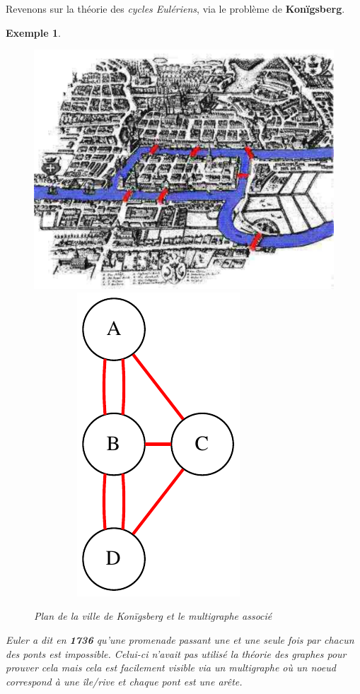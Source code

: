 \documentclass[12pt]{article}
\newtheorem{exemple}{Exemple}[section]
\begin{document}
Revenons sur la théorie des \textit{cycles Eulériens}, via le problème de \textbf{Konïgsberg}.
\begin{exemple}$ $ \\
\begin{figure}[h!]
    \begin{center}
    \includegraphics[scale=0.4]{konigsberg.pdf}$\qquad\qquad$
    \includegraphics[scale=0.5]{konig.pdf}
    \caption{Plan de la ville de Konïgsberg et le multigraphe associé}
    \end{center}
\end{figure}

Euler a dit en \textbf{1736} qu'une promenade passant une et une seule fois par chacun des ponts est impossible.
Celui-ci n'avait pas utilisé la théorie des graphes pour prouver cela mais cela est facilement visible via un multigraphe où un noeud
correspond à une île/rive et chaque pont est une arête.
\end{exemple}
\end{document}
